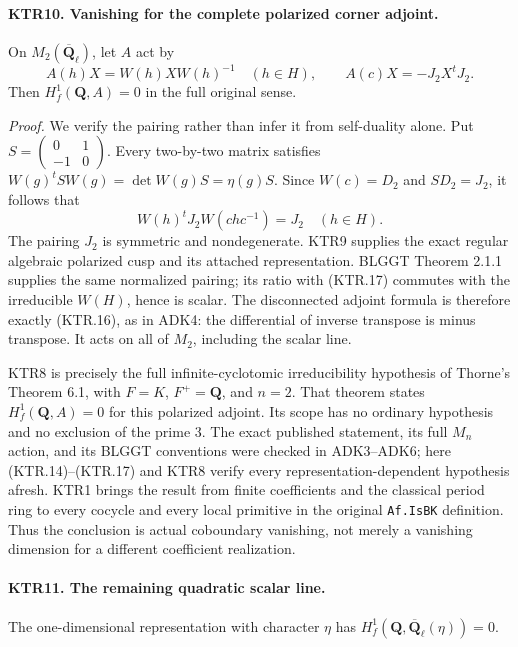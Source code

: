 \documentclass[11pt,a4paper]{article}
\numberwithin{equation}{section}
\theoremstyle{remark}\newtheorem{remark}[theorem]{Remark}
\begin{document}
\paragraph{KTR10. Vanishing for the complete polarized corner adjoint.}
\label{claim:KTR10}
On \(M_2(\overline{\mathbf Q}_\ell)\), let \(A\) act by
\[
 A(h)X=W(h)XW(h)^{-1}\quad(h\in H),
 \qquad A(c)X=-J_2X^tJ_2.
 \tag{KTR.16}
\]
Then \(H^1_f(\mathbf Q,A)=0\) in the full original sense.

\emph{Proof.}
We verify the pairing rather than infer it from self-duality
alone.  Put
\(S=\left(\begin{smallmatrix}0&1\\-1&0\end{smallmatrix}\right)\).
Every two-by-two matrix satisfies
\(W(g)^t S W(g)=\det W(g)S=\eta(g)S\).
Since \(W(c)=D_2\) and \(S D_2=J_2\), it follows that
\[
             W(h)^tJ_2W(chc^{-1})=J_2\quad(h\in H).
 \tag{KTR.17}
\]
The pairing \(J_2\) is symmetric and nondegenerate.
KTR9 supplies the exact regular algebraic polarized cusp and
its attached representation.  BLGGT Theorem 2.1.1 supplies the
same normalized pairing; its ratio with (KTR.17) commutes with
the irreducible \(W(H)\), hence is scalar.  The disconnected
adjoint formula is therefore exactly (KTR.16), as in ADK4:
the differential of inverse transpose is minus transpose.
It acts on all of \(M_2\), including the scalar line.

KTR8 is precisely the full infinite-cyclotomic irreducibility
hypothesis of Thorne's Theorem 6.1, with \(F=K\),
\(F^+=\mathbf Q\), and \(n=2\).
That theorem states \(H^1_f(\mathbf Q,A)=0\) for this
polarized adjoint.  Its scope has no ordinary hypothesis and
no exclusion of the prime \(3\).  The exact published
statement, its full \(M_n\) action, and its BLGGT conventions
were checked in ADK3--ADK6; here (KTR.14)--(KTR.17) and KTR8
verify every representation-dependent hypothesis afresh.
KTR1 brings the result from finite coefficients and the classical
period ring to every cocycle and every local primitive in the
original \texttt{Af.\allowbreak Is\allowbreak BK} definition.  Thus the conclusion
is actual coboundary vanishing, not merely a vanishing dimension
for a different coefficient realization.

\paragraph{KTR11. The remaining quadratic scalar line.}
\label{claim:KTR11}
The one-dimensional representation with character \(\eta\)
has \(H^1_f(\mathbf Q,\overline{\mathbf Q}_\ell(\eta))=0\).
\end{document}

